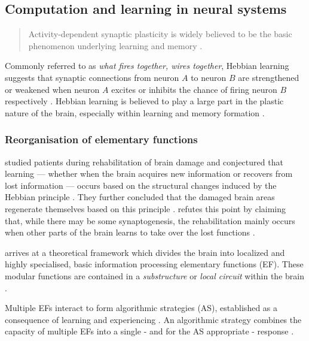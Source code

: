 \documentclass[a4paper,oneside]{memoir}
\begin{document}
\subsection{Computation and learning in neural systems}
\begin{quote}
  Activity-dependent synaptic plasticity is widely believed to be the basic
  phenomenon underlying learning and memory \autocite{dayan2001}.
\end{quote}

Commonly referred to as \textit{what fires together, wires together}, Hebbian
learning suggests that synaptic connections from neuron $A$ to neuron $B$
are strengthened or weakened when neuron $A$ excites or inhibits the chance of
firing neuron $B$ respectively \autocite{dayan2001}.
Hebbian learning is believed to play a large part in the plastic nature of the
brain, especially within learning and memory formation
\autocite{dayan2001, Johnston2009, Robertson1999}.

\subsubsection{Reorganisation of elementary functions}
\label{ref}

\autocite{Robertson1999} studied patients during
rehabilitation of brain damage and conjectured that learning --- whether when the
brain acquires new information or recovers from lost information --- occurs based
on the structural changes induced by the Hebbian principle
\autocite{Robertson1999}. They further concluded that the damaged brain areas
regenerate themselves based on this principle \autocite{Robertson1999}.
\autocite{Mogensen2011} refutes this point by claiming that, while there
may be some synaptogenesis, the rehabilitation mainly occurs when other parts
of the brain learns to take over the lost functions \autocite{Mogensen2011}.

\autocite{Mogensen2011} arrives at a theoretical framework which divides the
brain into localized and highly specialised, basic information
processing elementary functions (EF). These modular functions are contained
in a \textit{substructure} or \textit{local circuit}
within the brain \autocite{Mogensen2011}.

Multiple EFs interact to form algorithmic strategies (AS), established as
a consequence of learning and experiencing \autocite{Mogensen2011}. An
algorithmic strategy combines the capacity of multiple EFs into a single - and
for the AS appropriate - response \autocite{Mogensen2011, Mogensen2012b}.
\end{document}
